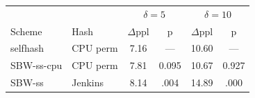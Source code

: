 \begin{tabular}{@{}ll|cc|cc@{}}
\toprule
& & \multicolumn{2}{c|}{$\delta=5$} & \multicolumn{2}{c}{$\delta=10$} \\
Scheme & Hash & $\Delta$ppl & p & $\Delta$ppl & p \\
\midrule
selfhash & CPU perm & 7.16 & --- & 10.60 & --- \\
SBW-ss-cpu & CPU perm & 7.81 & 0.095 & 10.67 & 0.927 \\
SBW-ss & Jenkins & 8.14 & .004 & 14.89 & .000 \\
\bottomrule
\end{tabular}
